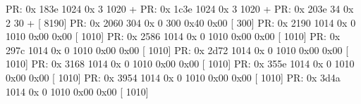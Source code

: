 \documentclass[letterpaper,10pt,english]{sphinxmanual}
\begin{document}
\begin{sphinxVerbatim}[commandchars=\\\{\}]
PR: 0x    183e    1024  0x   3    1020  \PYGZhy{}\PYGZhy{}\PYGZhy{}\PYGZhy{}\PYGZhy{}\PYGZhy{}  \PYGZhy{}\PYGZhy{}\PYGZhy{}\PYGZhy{}\PYGZhy{}\PYGZhy{}  \PYGZhy{}\PYGZhy{}\PYGZhy{}\PYGZhy{}\PYGZhy{}\PYGZhy{} + \PYGZhy{}\PYGZhy{}   \PYGZhy{}\PYGZhy{}
PR: 0x    1c3e    1024  0x   3    1020  \PYGZhy{}\PYGZhy{}\PYGZhy{}\PYGZhy{}\PYGZhy{}\PYGZhy{}  \PYGZhy{}\PYGZhy{}\PYGZhy{}\PYGZhy{}\PYGZhy{}\PYGZhy{}  \PYGZhy{}\PYGZhy{}\PYGZhy{}\PYGZhy{}\PYGZhy{}\PYGZhy{} + \PYGZhy{}\PYGZhy{}   \PYGZhy{}\PYGZhy{}
PR: 0x    203e      34  0x   2      30  \PYGZhy{}\PYGZhy{}\PYGZhy{}\PYGZhy{}\PYGZhy{}\PYGZhy{}  \PYGZhy{}\PYGZhy{}\PYGZhy{}\PYGZhy{}\PYGZhy{}\PYGZhy{}  \PYGZhy{}\PYGZhy{}\PYGZhy{}\PYGZhy{}\PYGZhy{}\PYGZhy{} + \PYGZhy{}\PYGZhy{}   \PYGZhy{}\PYGZhy{} [    8190]
PR: 0x    2060     304  0x   0     300  \PYGZhy{}\PYGZhy{}\PYGZhy{}\PYGZhy{}\PYGZhy{}\PYGZhy{}  \PYGZhy{}\PYGZhy{}\PYGZhy{}\PYGZhy{}\PYGZhy{}\PYGZhy{}  \PYGZhy{}\PYGZhy{}\PYGZhy{}\PYGZhy{}\PYGZhy{}\PYGZhy{} 0x40 0x00 [     300]
PR: 0x    2190    1014  0x   0    1010  \PYGZhy{}\PYGZhy{}\PYGZhy{}\PYGZhy{}\PYGZhy{}\PYGZhy{}  \PYGZhy{}\PYGZhy{}\PYGZhy{}\PYGZhy{}\PYGZhy{}\PYGZhy{}  \PYGZhy{}\PYGZhy{}\PYGZhy{}\PYGZhy{}\PYGZhy{}\PYGZhy{} 0x00 0x00 [    1010]
PR: 0x    2586    1014  0x   0    1010  \PYGZhy{}\PYGZhy{}\PYGZhy{}\PYGZhy{}\PYGZhy{}\PYGZhy{}  \PYGZhy{}\PYGZhy{}\PYGZhy{}\PYGZhy{}\PYGZhy{}\PYGZhy{}  \PYGZhy{}\PYGZhy{}\PYGZhy{}\PYGZhy{}\PYGZhy{}\PYGZhy{} 0x00 0x00 [    1010]
PR: 0x    297c    1014  0x   0    1010  \PYGZhy{}\PYGZhy{}\PYGZhy{}\PYGZhy{}\PYGZhy{}\PYGZhy{}  \PYGZhy{}\PYGZhy{}\PYGZhy{}\PYGZhy{}\PYGZhy{}\PYGZhy{}  \PYGZhy{}\PYGZhy{}\PYGZhy{}\PYGZhy{}\PYGZhy{}\PYGZhy{} 0x00 0x00 [    1010]
PR: 0x    2d72    1014  0x   0    1010  \PYGZhy{}\PYGZhy{}\PYGZhy{}\PYGZhy{}\PYGZhy{}\PYGZhy{}  \PYGZhy{}\PYGZhy{}\PYGZhy{}\PYGZhy{}\PYGZhy{}\PYGZhy{}  \PYGZhy{}\PYGZhy{}\PYGZhy{}\PYGZhy{}\PYGZhy{}\PYGZhy{} 0x00 0x00 [    1010]
PR: 0x    3168    1014  0x   0    1010  \PYGZhy{}\PYGZhy{}\PYGZhy{}\PYGZhy{}\PYGZhy{}\PYGZhy{}  \PYGZhy{}\PYGZhy{}\PYGZhy{}\PYGZhy{}\PYGZhy{}\PYGZhy{}  \PYGZhy{}\PYGZhy{}\PYGZhy{}\PYGZhy{}\PYGZhy{}\PYGZhy{} 0x00 0x00 [    1010]
PR: 0x    355e    1014  0x   0    1010  \PYGZhy{}\PYGZhy{}\PYGZhy{}\PYGZhy{}\PYGZhy{}\PYGZhy{}  \PYGZhy{}\PYGZhy{}\PYGZhy{}\PYGZhy{}\PYGZhy{}\PYGZhy{}  \PYGZhy{}\PYGZhy{}\PYGZhy{}\PYGZhy{}\PYGZhy{}\PYGZhy{} 0x00 0x00 [    1010]
PR: 0x    3954    1014  0x   0    1010  \PYGZhy{}\PYGZhy{}\PYGZhy{}\PYGZhy{}\PYGZhy{}\PYGZhy{}  \PYGZhy{}\PYGZhy{}\PYGZhy{}\PYGZhy{}\PYGZhy{}\PYGZhy{}  \PYGZhy{}\PYGZhy{}\PYGZhy{}\PYGZhy{}\PYGZhy{}\PYGZhy{} 0x00 0x00 [    1010]
PR: 0x    3d4a    1014  0x   0    1010  \PYGZhy{}\PYGZhy{}\PYGZhy{}\PYGZhy{}\PYGZhy{}\PYGZhy{}  \PYGZhy{}\PYGZhy{}\PYGZhy{}\PYGZhy{}\PYGZhy{}\PYGZhy{}  \PYGZhy{}\PYGZhy{}\PYGZhy{}\PYGZhy{}\PYGZhy{}\PYGZhy{} 0x00 0x00 [    1010]

\end{sphinxVerbatim}
\end{document}
